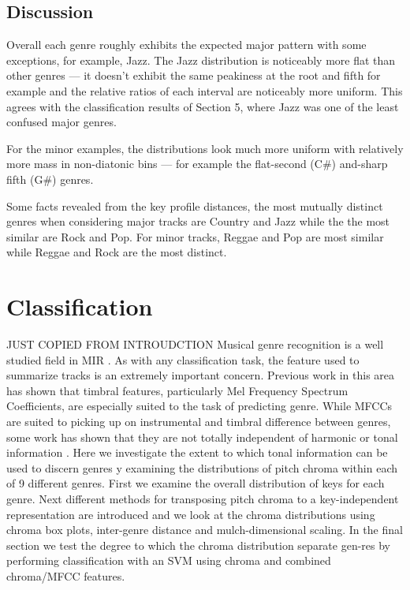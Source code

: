 \documentclass{article}
\begin{document}
\subsection{Discussion}
Overall each genre roughly exhibits the expected major pattern with some exceptions, for example,  Jazz. The Jazz distribution is noticeably more flat than other genres --- it doesn't exhibit the same peakiness at the root and fifth for example and the relative ratios of each interval are noticeably more uniform. This agrees with the classification results of Section 5, where Jazz was one of the least confused major genres.

For the minor examples, the distributions look much more uniform with relatively more mass in non-diatonic bins --- for example the flat-second (C\#) and-sharp fifth (G\#) genres.

Some facts revealed from the key profile distances, the most mutually distinct genres when considering major tracks are Country and Jazz while the the most similar are Rock and Pop. For minor tracks, Reggae and Pop are most similar while Reggae and Rock are the most distinct.


\section{Classification}
JUST COPIED FROM INTROUDCTION
Musical genre recognition is a well studied field in MIR \cite{fu_survey_2011}. As with any classification task, the feature used to summarize tracks is an extremely important concern. Previous work in this area has shown that timbral features, particularly Mel Frequency Spectrum Coefficients, are especially suited to the task of predicting genre. While MFCCs are suited to picking up on instrumental and timbral difference between genres, some work has shown that they are not totally independent of harmonic or tonal information \cite{li_genre_2011}. Here we investigate the extent to which tonal information can be used to discern genres y examining the distributions of pitch chroma within each of 9 different genres. First we examine the overall distribution of keys for each genre. Next different methods for transposing pitch chroma to a key-independent representation are introduced and we look at the chroma distributions using chroma box plots, inter-genre distance and mulch-dimensional scaling. In the final section we test the degree to which the chroma distribution separate gen-res by performing classification with an SVM using chroma and combined chroma/MFCC features.
\end{document}
